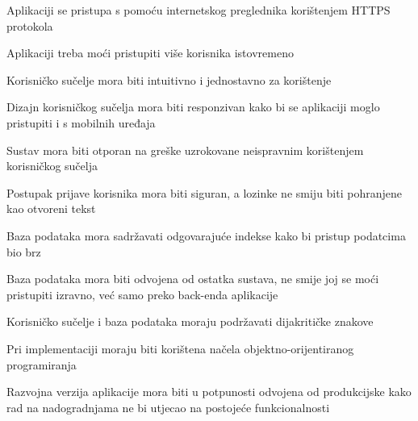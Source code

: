 			 \begin{packed_item}
			 	\item Aplikaciji se pristupa s pomoću internetskog preglednika korištenjem HTTPS protokola
			 	\item Aplikaciji treba moći pristupiti više korisnika istovremeno
			 	\item Korisničko sučelje mora biti intuitivno i jednostavno za korištenje
			 	\item Dizajn korisničkog sučelja mora biti responzivan kako bi se aplikaciji moglo pristupiti i s mobilnih uređaja
			 	\item Sustav mora biti otporan na greške uzrokovane neispravnim korištenjem korisničkog sučelja
			 	\item Postupak prijave korisnika mora biti siguran, a lozinke ne smiju biti pohranjene kao otvoreni tekst
			 	\item Baza podataka mora sadržavati odgovarajuće indekse kako bi pristup podatcima bio brz
			 	\item Baza podataka mora biti odvojena od ostatka sustava, ne smije joj se moći pristupiti izravno, već samo preko back-enda aplikacije
			 	\item Korisničko sučelje i baza podataka moraju podržavati dijakritičke znakove
			 	\item Pri implementaciji moraju biti korištena načela objektno-orijentiranog programiranja
			 	\item Razvojna verzija aplikacije mora biti u potpunosti odvojena od produkcijske kako rad na nadogradnjama ne bi utjecao na postojeće funkcionalnosti
			 	
			 \end{packed_item}
			 \eject
			 
			 
			 
	
